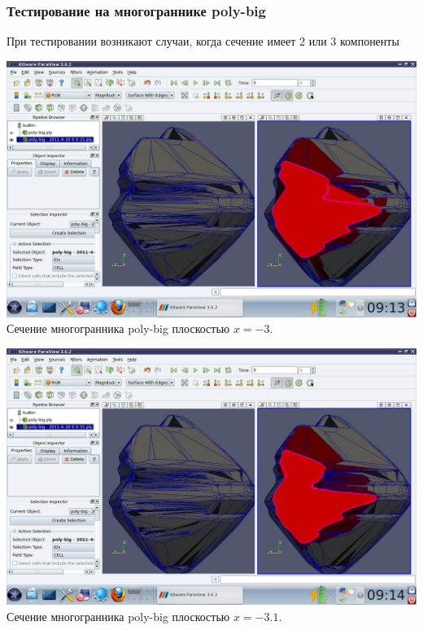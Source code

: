 \documentclass[a4paper,12pt, titlepage]{article}
\begin{document}
\subsubsection{Тестирование на многограннике poly-big}
	\begin{flushleft}
		При тестировании возникают случаи, когда сечение имеет 2 или 3 компоненты
	\end{flushleft}
	\begin{flushleft}
		\includegraphics[trim = 220 65 10 140, clip, width=15cm]{poly-big/3.png}
		Сечение многогранника poly-big плоскостью $x = -3$.
	\end{flushleft}
	\begin{flushleft}
		\includegraphics[trim = 220 65 10 140, clip, width=15cm]{poly-big/31.png}
		Сечение многогранника poly-big плоскостью $x = -3.1$.
	\end{flushleft}
\end{document}
